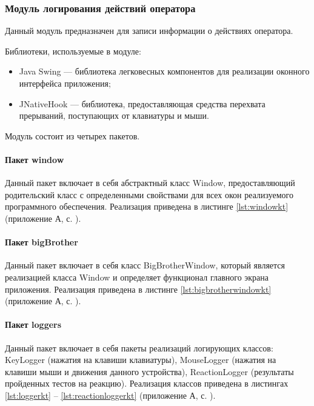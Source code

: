 \subsubsection{Модуль логирования действий оператора}
Данный модуль предназначен для записи информации о действиях оператора.

Библиотеки, используемые в модуле:

\begin{itemize}[leftmargin=1.6\parindent]
\item Java Swing \cite{swing} --- библиотека легковесных компонентов для реализации оконного интерфейса приложения;
\item JNativeHook \cite{jnativehook} --- библиотека, предоставляющая средства перехвата прерываний, поступающих от клавиатуры и мыши.
\end{itemize}

Модуль состоит из четырех пакетов.

\paragraph{Пакет window \newline}
Данный пакет включает в себя абстрактный класс Window, предоставляющий родительский класс с определенными свойствами для всех окон реализуемого программного обеспечения. Реализация приведена в листинге \ref{lst:windowkt} (приложение А, с. \pageref{chp:application-a}).

\paragraph{Пакет bigBrother \newline}
Данный пакет включает в себя класс BigBrotherWindow, который является реализацией класса Window и определяет функционал главного экрана приложения. Реализация приведена в листинге \ref{lst:bigbrotherwindowkt} (приложение А, с. \pageref{chp:application-a}).

\paragraph{Пакет loggers \newline}
Данный пакет включает в себя пакеты реализаций логирующих классов: Key\-Logger (нажатия на клавиши клавиатуры), MouseLogger (нажатия на клавиши мыши и движения данного устройства), ReactionLogger (результаты пройденных тестов на реакцию). Реализация классов приведена в листингах \ref{lst:loggerkt} -- \ref{lst:reactionloggerkt} (приложение А, с. \pageref{chp:application-a}).


